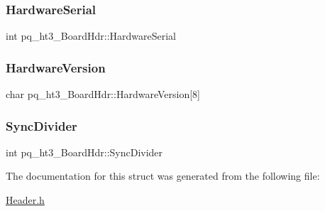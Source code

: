 \subsubsection{\texorpdfstring{Hardware\+Serial}{HardwareSerial}}
{\footnotesize\ttfamily int pq\+\_\+ht3\+\_\+\+Board\+Hdr\+::\+Hardware\+Serial}

\mbox{\label{structpq__ht3___board_hdr_ae37b0ecf51eefbeb9d1181184e988046}} 
\subsubsection{\texorpdfstring{Hardware\+Version}{HardwareVersion}}
{\footnotesize\ttfamily char pq\+\_\+ht3\+\_\+\+Board\+Hdr\+::\+Hardware\+Version\mbox{[}8\mbox{]}}

\mbox{\label{structpq__ht3___board_hdr_a322eae8d2fa745909ed7031645a56126}} 
\subsubsection{\texorpdfstring{Sync\+Divider}{SyncDivider}}
{\footnotesize\ttfamily int pq\+\_\+ht3\+\_\+\+Board\+Hdr\+::\+Sync\+Divider}



The documentation for this struct was generated from the following file\+:\begin{DoxyCompactItemize}
\item 
\hyperlink{_header_8h}{Header.\+h}\end{DoxyCompactItemize}
